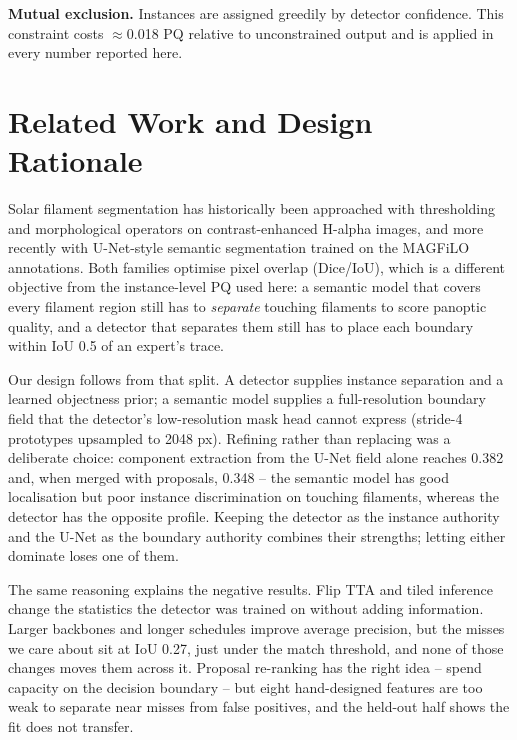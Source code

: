 \documentclass[conference]{IEEEtran}
\begin{document}
\textbf{Mutual exclusion.} Instances are assigned greedily by detector confidence. This constraint costs $\approx$0.018 PQ relative to unconstrained output and is applied in every number reported here.
\section{Related Work and Design Rationale}
Solar filament segmentation has historically been approached with thresholding
and morphological operators on contrast-enhanced H-alpha images, and more
recently with U-Net-style semantic segmentation trained on the MAGFiLO
annotations. Both families optimise pixel overlap (Dice/IoU), which is a
different objective from the instance-level PQ used here: a semantic model that
covers every filament region still has to \emph{separate} touching filaments to
score panoptic quality, and a detector that separates them still has to place
each boundary within IoU 0.5 of an expert's trace.

Our design follows from that split. A detector supplies instance separation and
a learned objectness prior; a semantic model supplies a full-resolution
boundary field that the detector's low-resolution mask head cannot express
(stride-4 prototypes upsampled to 2048 px). Refining rather than replacing was a
deliberate choice: component extraction from the U-Net field alone reaches 0.382
and, when merged with proposals, 0.348 -- the semantic model has good
localisation but poor instance discrimination on touching filaments, whereas the
detector has the opposite profile. Keeping the detector as the instance
authority and the U-Net as the boundary authority combines their strengths;
letting either dominate loses one of them.

The same reasoning explains the negative results. Flip TTA and tiled inference
change the statistics the detector was trained on without adding information.
Larger backbones and longer schedules improve average precision, but the misses
we care about sit at IoU 0.27, just under the match threshold, and none of those
changes moves them across it. Proposal re-ranking has the right idea -- spend
capacity on the decision boundary -- but eight hand-designed features are too
weak to separate near misses from false positives, and the held-out half shows
the fit does not transfer.
\end{document}
